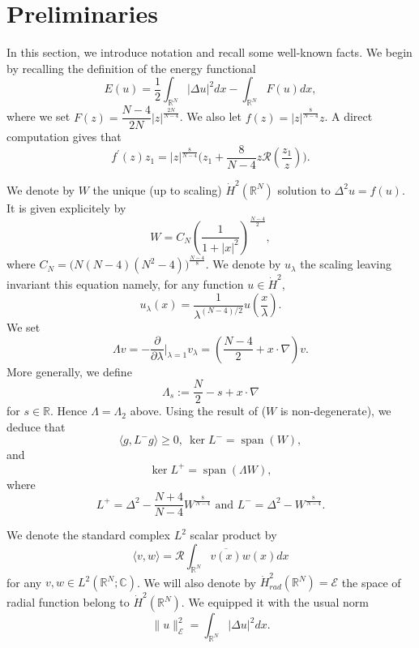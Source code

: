 \documentclass[a4paper,two-side,10pt]{amsart}
\newcommand{\R}{\mathbb{R}}
\numberwithin{equation}{section}
\DeclareMathOperator{\Span}{span}
\begin{document}
\section{Preliminaries}
In this section, we introduce notation and recall some well-known facts. We begin by recalling the definition of the energy functional
$$E(u)= \dfrac{1}{2}\int_{\R^N} |\Delta u|^2 dx - \int_{\R^N} F(u) dx,$$
where we set $F(z)= \dfrac{N-4}{2N} |z|^{\frac{2N}{N-4}}$. We also let $f(z)= |z|^{\frac{8}{N-4}} z$. A direct computation gives that
 $$f^\prime (z)z_1 = |z|^{\frac{8}{N-4}} \big(z_1 + \frac{8}{N-4} z \mathcal{R} (\frac{z_1}{z})\big).$$

  We denote by $W$ the unique (up to scaling) $\dot{H}^2 (\R^N)$ solution to $\Delta^2 u =f(u) $. It is given explicitely by
$$W=C_N \left(\dfrac{1}{1+|x|^2}\right)^{\frac{N-4}{2}},$$
where $C_N=\big(N(N-4)(N^2-4)\big)^{\frac{N-4}{8}}$. We denote by $u_\lambda$ the scaling leaving invariant this equation namely, for any function $u\in \dot{H}^2$,
$$u_\lambda (x)= \frac{1}{\lambda^{(N-4)/2}} u(\frac{x}{\lambda}).$$
We set
$$\Lambda v = - \frac{\partial}{\partial \lambda}\Big|_{\lambda =1} v_\lambda = \left(\frac{N-4}{2} +x\cdot\nabla \right) v.$$
More generally, we define
\[
\Lambda_s:=\frac{N}{2}-s+x\cdot\nabla
\]
for $s\in\R$. Hence $\Lambda=\Lambda_2$ above.
Using the result of \cite{MR1694339} ($W$ is non-degenerate), we deduce that
$$\langle g, L^- g  \rangle \geq 0,\ \ker L^- =\Span (W),$$
and
$$\ker L^+ = \Span (\Lambda W),$$
where
$$L^+ = \Delta^2  - \frac{N+4}{N-4} W^{\frac{8}{N-4}} \text{ and } L^- = \Delta^2 - W^{\frac{8}{N-4}}. $$








We denote the standard complex $L^2$ scalar product by
$$\langle v,w\rangle = \mathcal{R} \int_{\R^N} \overline{v(x)} w(x) dx$$
 for any $v,w\in L^2 (\R^N; \mathbb{C})$.
We will also denote by $\dot{H}^2_{rad}(\R^N)= \mathcal{E}$ the space of radial function belong to $\dot{H}^2 (\R^N)$. We equipped it with the usual norm
$$\|u\|_{\mathcal{E}}^2=\int_{\R^N} |\Delta u|^2 dx. $$ 
\end{document}
